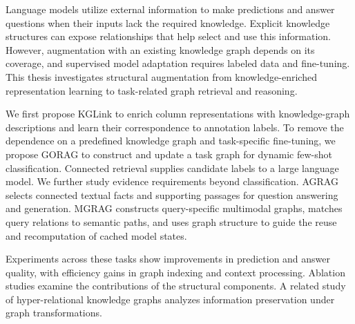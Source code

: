 Language models utilize external information to make predictions and answer questions when their inputs lack the required knowledge. Explicit knowledge structures can expose relationships that help select and use this information. However, augmentation with an existing knowledge graph depends on its coverage, and supervised model adaptation requires labeled data and fine-tuning. This thesis investigates structural augmentation from knowledge-enriched representation learning to task-related graph retrieval and reasoning.

We first propose KGLink to enrich column representations with knowledge-graph descriptions and learn their correspondence to annotation labels. To remove the dependence on a predefined knowledge graph and task-specific fine-tuning, we propose GORAG to construct and update a task graph for dynamic few-shot classification. Connected retrieval supplies candidate labels to a large language model. We further study evidence requirements beyond classification. AGRAG selects connected textual facts and supporting passages for question answering and generation. MGRAG constructs query-specific multimodal graphs, matches query relations to semantic paths, and uses graph structure to guide the reuse and recomputation of cached model states.

Experiments across these tasks show improvements in prediction and answer quality, with efficiency gains in graph indexing and context processing. Ablation studies examine the contributions of the structural components. A related study of hyper-relational knowledge graphs analyzes information preservation under graph transformations.
